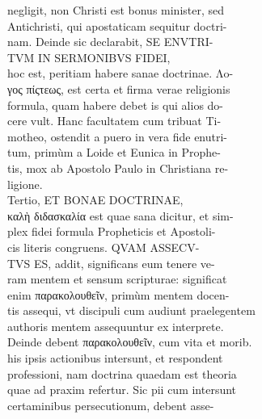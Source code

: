\documentclass{article}
\begin{document}
\begin{pages}
                negligit, non Christi est bonus minister, sed \\
                Antichristi, qui apostaticam sequitur doctri- \\
                nam. Deinde sic declarabit, SE ENVTRI- \\
                TVM IN SERMONIBVS FIDEI, \\
                hoc est, peritiam habere sanae doctrinae. Λo- \\
                γος πίςτεως, est certa et firma verae religionis \\
                formula, quam habere debet is qui alios do- \\
                cere vult. Hanc facultatem cum tribuat Ti- \\
                motheo, ostendit a puero in vera fide enutri- \\
                tum, primùm a Loide et Eunica in Prophe- \\
                tis, mox ab Apostolo Paulo in Christiana re- \\
                ligione. \\
                Tertio, ET BONAE DOCTRINAE, \\
                καλὴ διδασκαλία est quae sana dicitur, et sim- \\
                plex fidei formula Propheticis et Apostoli- \\
                cis literis congruens. QVAM ASSECV- \\
                TVS ES, addit, significans eum tenere ve- \\
                ram mentem et sensum scripturae: significat \\
                enim παρακολουθεῖν, primùm mentem docen- \\
                tis assequi, vt discipuli cum audiunt praelegentem \\
                authoris mentem assequuntur ex interprete. \\
                Deinde debent παρακολουθεῖν, cum vita et morib. \\
                his ipsis actionibus intersunt, et respondent \\
                professioni, nam doctrina quaedam est theoria \\
                quae ad praxim refertur. Sic pii cum intersunt \\
                certaminibus persecutionum, debent asse- \\

\end{pages}
\end{document}
